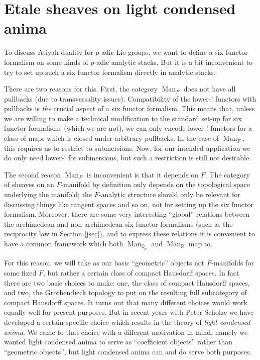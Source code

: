 \documentclass[12pt]{article}
\newcommand{\on}{\operatorname}
\begin{document}
\section{Etale sheaves on light condensed anima}\label{etalesec}

To discuss Atiyah duality for $p$-adic Lie groups, we want to define a six functor formalism on some kinds of $p$-adic analytic stacks.  But it is a bit inconvenient to try to set up such a six functor formalism directly in analytic stacks.

There are two reasons for this.  First, the category $\on{Man}_F$ does not have all pullbacks (due to transversality issues).  Compatibility of the lower-$!$ functors with pullbacks is \emph{the} crucial aspect of a six functor formalism.  This means that, unless we are willing to make a technical modification to the standard set-up for six functor formalisms (which we are not), we can only encode lower-$!$ functors for a class of maps which is closed under arbitrary pullbacks.  In the case of $\on{Man}_F$, this requires us to restrict to submersions.  Now, for our intended application we do only need lower-$!$ for submersions, but such a restriction is still not desirable.


The second reason $\on{Man}_F$ is inconvenient is that it depends on $F$.  The category of sheaves on an $F$-manifold by definition only depends on the topological space underlying the manifold; the $F$-analytic structure should only be relevant for discussing things like tangent spaces and so on, not for setting up the six functor formalism.  Moreover, there are some very interesting ``global'' relations between the archimedean and non-archimedean six functor formalisms  (such as the reciprocity law in Section \ref{jsec}), and to express these relations it is convenient to have a common framework which both $\on{Man}_{\mathbb{Q}_p}$ and $\on{Man}_\mathbb{R}$ map to.

For this reason, we will take as our basic ``geometric'' objects not $F$-manifolds for some fixed $F$, but rather a certain class of compact Hausdorff spaces.  In fact there are two basic choices to make: one, the class of compact Hausdorff spaces, and two, the Grothendieck topology to put on the resulting full subcategory of compact Hausdorff spaces.  It turns out that many different choices would work equally well for present purposes.  But in recent years with Peter Scholze we have developed a certain specific choice which results in the theory of  \emph{light condensed anima}.  We came to that choice with a different motivation in mind, namely we wanted light condensed anima to serve as ``coefficient objects'' rather than ``geometric objects'', but light condensed anima can and do serve both purposes.
\end{document}
